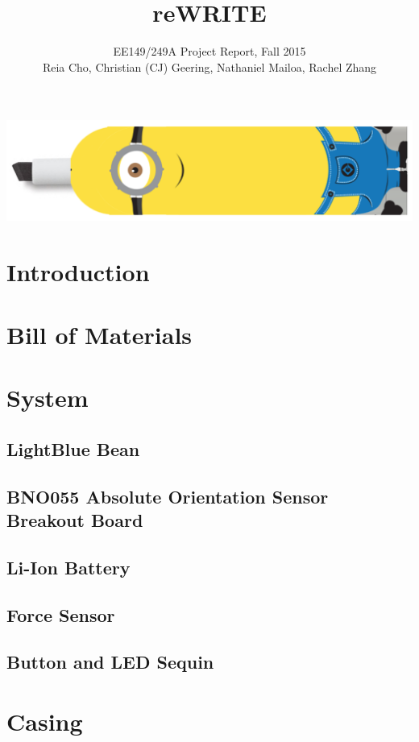 \documentclass[12pt,journal]{IEEEtran}
\begin{document}
\title{reWRITE}

\author{EE149/249A Project Report, Fall 2015

Reia Cho, Christian (CJ) Geering, Nathaniel Mailoa, Rachel Zhang}


\maketitle

\includegraphics[width=\linewidth]{figures/minion}

\section{Introduction}


\section{Bill of Materials}


\section{System}
\subsection{LightBlue Bean}
\subsection{BNO055 Absolute Orientation Sensor Breakout Board}
\subsection{Li-Ion Battery}
\subsection{Force Sensor}
\subsection{Button and LED Sequin}

\section{Casing}
\end{document}
